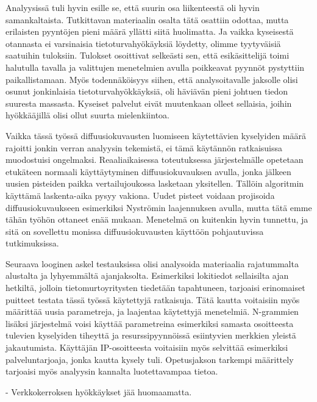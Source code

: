Analyysissä tuli hyvin esille se, että suurin osa liikenteestä oli hyvin samankaltaista. Tutkittavan materiaalin osalta tätä osattiin odottaa, mutta erilaisten pyyntöjen pieni määrä yllätti
siitä huolimatta. Ja vaikka kyseisestä otannasta ei varsinaisia tietoturvahyökäyksiä löydetty, olimme tyytyväisiä saatuihin tuloksiin. Tulokset osoittivat selkeästi sen, että esikäsittelijä toimi halutulla tavalla ja 
valittujen menetelmien avulla poikkeavat pyynnöt pystyttiin paikallistamaan. Myös todennäköisyys siihen, että analysoitavalle jaksolle olisi osunut jonkinlaisia tietoturvahyökkäyksiä, oli häviävän pieni
johtuen tiedon suuresta massasta. Kyseiset palvelut eivät muutenkaan olleet sellaisia, joihin hyökkääjillä olisi ollut suurta mielenkiintoa.  

Vaikka tässä työssä diffuusiokuvausten luomiseen käytettävien kyselyiden määrä rajoitti jonkin verran analyysin tekemistä, ei tämä käytännön ratkaisuissa muodostuisi ongelmaksi. Reaaliaikaisessa toteutuksessa
järjestelmälle opetetaan etukäteen normaali käyttäytyminen diffuusiokuvauksen avulla, jonka jälkeen uusien pisteiden paikka vertailujoukossa lasketaan yksitellen. Tällöin algoritmin käyttämä laskenta-aika
pysyy vakiona. Uudet pisteet voidaan projisoida diffuusiokuvaukseen esimerkiksi Nyströmin laajennuksen avulla, mutta tätä emme tähän työhön ottaneet enää mukaan. Menetelmä on kuitenkin hyvin tunnettu,
ja sitä on sovellettu monissa diffuusiokuvausten käyttöön pohjautuvissa tutkimuksissa.  

Seuraava looginen askel testauksissa olisi analysoida materiaalia rajatummalta alustalta ja lyhyemmältä ajanjaksolta. Esimerkiksi lokitiedot sellaisilta ajan hetkiltä, jolloin tietomurtoyritysten tiedetään tapahtuneen,
tarjoaisi erinomaiset puitteet testata tässä työssä käytettyjä ratkaisuja. Tätä kautta voitaisiin myös määrittää uusia parametreja, ja laajentaa käytettyjä menetelmiä. N-grammien lisäksi järjestelmä
voisi käyttää parametreina esimerkiksi samasta osoitteesta tulevien kyselyiden tiheyttä ja resurssipyynnöissä esiintyvien merkkien yleistä jakautumista. Käyttäjän IP-osoitteesta voitaisiin myös selvittää esimerkiksi
palveluntarjoaja, jonka kautta kysely tuli. Opetusjakson tarkempi määrittely tarjoaisi myös analyysin kannalta luotettavampaa tietoa. 

- Verkkokerroksen hyökkäykset jää huomaamatta. 

